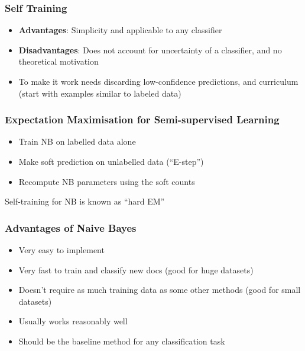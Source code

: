 \documentclass[landscape, 8pt]{extarticle}
\begin{document}
\begin{multicols}{3}
\subsubsection{Self Training}
\begin{itemize}
    \setlength\itemsep{0em}
    \item \textbf{Advantages}: Simplicity and applicable to any classifier
    \item \textbf{Disadvantages}: Does not account for uncertainty of a classifier, and no theoretical motivation
    \item To make it work needs discarding low-confidence predictions, and curriculum (start with examples similar to labeled data)
\end{itemize}

\subsubsection{Expectation Maximisation for Semi-supervised Learning}

\begin{itemize}
    \setlength\itemsep{0em}
    \item Train NB on labelled data alone
    \item Make soft prediction on unlabelled data (``E-step'')
    \item Recompute NB parameters using the soft counts
\end{itemize}

Self-training for NB is known as ``hard EM''

\subsubsection{Advantages of Naive Bayes}
\begin{itemize}
    \setlength\itemsep{0em}
    \item Very easy to implement
    \item Very fast to train and classify new docs (good for huge datasets)
    \item Doesn't require as much training data as some other methods (good for small datasets)
    \item Usually works reasonably well
    \item Should be the baseline method for any classification task
\end{itemize}


\end{multicols}
\end{document}
